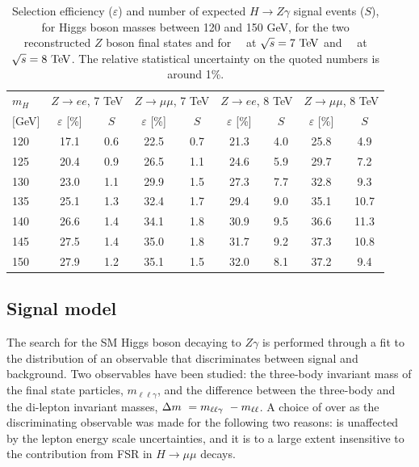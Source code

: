 \begin{table}[!htbp]
  \begin{center}
  \caption{Selection efficiency ($\varepsilon$) and number of expected
    $H\to Z\gamma$ signal events ($S$),
    for Higgs boson masses between 120 and 150 GeV,
    for the two reconstructed $Z$ boson final states and
    for \lumiseventev~\ifb\ at $\sqrt{s}=7\TeV$
    and \lumieighttev~\ifb\ at $\sqrt{s}=8\TeV$.
    The relative statistical uncertainty on the quoted numbers
    is around 1\%.
  }
  \label{tab:expected_signalyields}
    \begin{tabular}{l|cc|cc|cc|cc}
\hline
\hline
$m_H$  & \multicolumn{2}{c|}{$Z\to ee$, 7 TeV} & \multicolumn{2}{c|}{$Z\to \mu\mu$, 7 TeV} & \multicolumn{2}{c|}{$Z\to ee$, 8 TeV} &  \multicolumn{2}{c}{$Z\to \mu\mu$, 8 TeV} \\
$[$GeV$]$ & $\varepsilon$ [\%] & $S$ & $\varepsilon$ [\%] & $S$ & $\varepsilon$ [\%] & $S$ & $\varepsilon$ [\%] & $S$ \\
\hline
120  &  17.1  &  0.6  &  22.5  &  0.7  &  21.3  &  4.0  &  25.8  &   4.9  \\
125  &  20.4  &  0.9  &  26.5  &  1.1  &  24.6  &  5.9  &  29.7  &   7.2  \\
130  &  23.0  &  1.1  &  29.9  &  1.5  &  27.3  &  7.7  &  32.8  &   9.3  \\
135  &  25.1  &  1.3  &  32.4  &  1.7  &  29.4  &  9.0  &  35.1  &  10.7  \\
140  &  26.6  &  1.4  &  34.1  &  1.8  &  30.9  &  9.5  &  36.6  &  11.3  \\
145  &  27.5  &  1.4  &  35.0  &  1.8  &  31.7  &  9.2  &  37.3  &  10.8  \\
150  &  27.9  &  1.2  &  35.1  &  1.5  &  32.0  &  8.1  &  37.2  &   9.4  \\
        \hline\hline
    \end{tabular}
  \end{center}
\end{table}

\subsection{Signal model}
The search for the SM Higgs boson decaying to $Z\gamma$ is performed through
a fit to the distribution of an observable that discriminates between signal
and background. Two observables have been studied: the three-body invariant
mass of the final state particles, $m_{\ell\ell\gamma}$,
and the difference between the three-body
and the di-lepton invariant masses, $\Delta m\  = m_{\ell \ell \gamma}\  - m_{\ell\ell}$.
A choice of \dm over \mllg as the discriminating observable was made for the 
following two reasons: \dm is unaffected by the lepton energy scale uncertainties, and
it is to a large extent insensitive to the contribution from FSR in $H\to\mu\mu$
decays.

